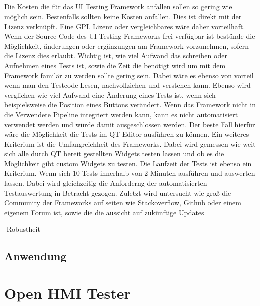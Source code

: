 		
		\paragraph{} Die Kosten die für das UI Testing Framework anfallen sollen so gering wie möglich sein. Bestenfalls sollten keine Kosten anfallen. Dies ist direkt mit der Lizenz verknüpft. Eine GPL Lizenz oder vergleichbares wäre daher vorteilhaft. Wenn der Source Code des UI Testing Frameworks frei verfügbar ist bestünde die Möglichkeit, änderungen oder ergänzungen am Framework vorzunehmen, sofern die Lizenz dies erlaubt. 
		Wichtig ist, wie viel Aufwand das schreiben oder Aufnehmen eines Tests ist, sowie die Zeit die benötigt wird um mit dem Framework familär zu werden sollte gering sein. Dabei wäre es ebenso von vorteil wenn man den Testcode Lesen, nachvollziehen und verstehen kann. Ebenso wird verglichen wie viel Aufwand eine Änderung eines Tests ist, wenn sich beispielsweise die Position eines Buttons verändert. Wenn das Framework nicht in die Verwendete Pipeline integriert werden kann, kann es nicht automatisiert verwendet werden und würde damit ausgeschlossen werden. Der beste Fall hierfür wäre die Möglichkeit die Tests im QT Editor ausführen zu können. Ein weiteres Kriterium ist die Umfangreichheit des Frameworks. Dabei wird gemessen wie weit sich alle durch QT bereit gestellten Widgets testen lassen und ob es die Möglichkeit gibt custom Widgets zu testen. Die Laufzeit der Tests ist ebenso ein Kriterium. Wenn sich 10 Tests innerhalb von 2 Minuten ausführen und auswerten lassen. Dabei wird gleichzeitig die Anforderng der automatisierten Testauswertung in Betracht gezogen. Zuletzt wird untersucht wie groß die Community der Frameworks auf seiten wie Stackoverflow, Github oder einem eigenem Forum ist, sowie die die aussicht auf zukünftige Updates
		
		-Robustheit

	\section{Anwendung}
\chapter{Open HMI Tester}
		
